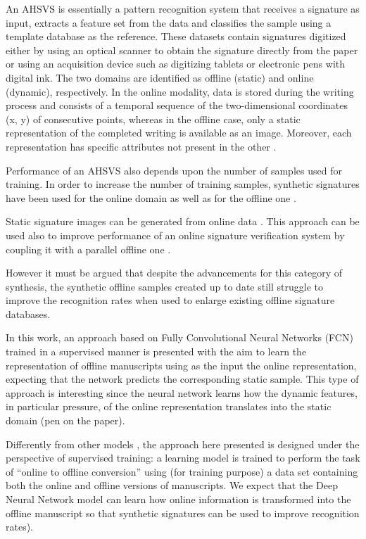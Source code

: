 An AHSVS is essentially a pattern recognition system that receives a signature as input, extracts a feature set from the data and classifies the sample using a template database as the reference. These datasets contain signatures digitized either by using an optical scanner to obtain the signature directly from the paper or using an acquisition device such as digitizing tablets or electronic pens with digital ink. The two domains are identified as offline (static) and online (dynamic), respectively.  In the online modality, data is stored during the writing process and consists of a temporal sequence of the two-dimensional coordinates (x, y) of consecutive points, whereas in the offline case, only a static representation of the completed writing is available as an image. Moreover, each representation has specific attributes not present in the other \cite{viard1999ireste}. 

Performance of an AHSVS also depends upon the number of samples used for training. In order to increase the number of training samples, synthetic signatures have been used for the online domain  \cite{galbally2009synthetic, galbally2012synthetic} as well as for the offline one \cite{ferrer2013synthetic, ferrer2013realistic}.

Static signature images can be generated from online data  \cite{diaz2014generation, guest2013assessment, ferrer2013realistic, galbally2015line}. This approach can be used also to improve performance of an online signature verification system by coupling it with a parallel offline one \cite{chapter}.

However it must be argued that despite the advancements for this category of synthesis, the synthetic offline samples created up to date still struggle to improve the recognition rates when used to enlarge existing offline signature databases.

In this work, an approach based on Fully Convolutional Neural Networks (FCN) trained in a supervised manner is presented with the aim to learn the representation of offline manuscripts using as the input the online representation, expecting that the network predicts the corresponding static sample. This type of approach is interesting since the neural network learns how the dynamic features, in particular pressure, of the online representation translates into the static domain (pen on the paper).

Differently from other models \cite{ferrer2013synthetic, ferrer2013realistic, diaz2014generation}, the approach here presented is designed under the perspective of supervised training: a learning model is trained to perform the task of “online to offline conversion” using (for training purpose) a data set containing both the online and offline versions of manuscripts. We expect that the Deep Neural Network model can learn how online information is transformed into the offline manuscript so that synthetic signatures can be used to improve recognition rates). 

